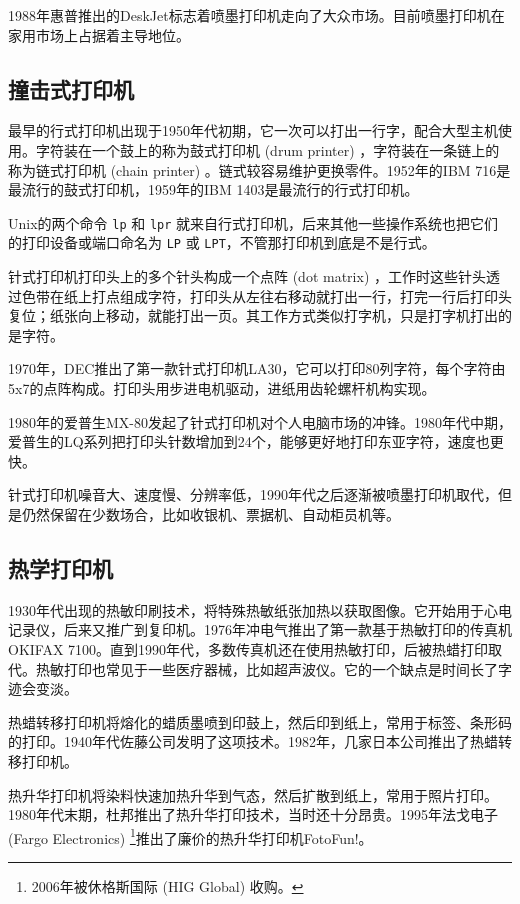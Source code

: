 1988年惠普推出的DeskJet标志着喷墨打印机走向了大众市场。目前喷墨打印机在家用市场上占据着主导地位。

\subsection{撞击式打印机}

最早的行式打印机出现于1950年代初期，它一次可以打出一行字，配合大型主机使用。字符装在一个鼓上的称为鼓式打印机 (drum printer) ，字符装在一条链上的称为链式打印机 (chain printer) 。链式较容易维护更换零件。1952年的IBM 716是最流行的鼓式打印机，1959年的IBM 1403是最流行的行式打印机。

Unix的两个命令 \texttt{lp} 和 \texttt{lpr} 就来自行式打印机，后来其他一些操作系统也把它们的打印设备或端口命名为 \texttt{LP} 或 \texttt{LPT}，不管那打印机到底是不是行式。

针式打印机打印头上的多个针头构成一个点阵 (dot matrix) ，工作时这些针头透过色带在纸上打点组成字符，打印头从左往右移动就打出一行，打完一行后打印头复位；纸张向上移动，就能打出一页。其工作方式类似打字机，只是打字机打出的是字符。

1970年，DEC\indexDEC{}推出了第一款针式打印机LA30，它可以打印80列字符，每个字符由5x7的点阵构成。打印头用步进电机驱动，进纸用齿轮螺杆机构实现。

1980年的爱普生MX-80发起了针式打印机对个人电脑市场的冲锋。1980年代中期，爱普生的LQ系列把打印头针数增加到24个，能够更好地打印东亚字符，速度也更快。

针式打印机噪音大、速度慢、分辨率低，1990年代之后逐渐被喷墨打印机取代，但是仍然保留在少数场合，比如收银机、票据机、自动柜员机等。

\subsection{热学打印机}

1930年代出现的热敏印刷技术，将特殊热敏纸张加热以获取图像。它开始用于心电记录仪，后来又推广到复印机。1976年冲电气推出了第一款基于热敏打印的传真机 OKIFAX 7100。直到1990年代，多数传真机还在使用热敏打印，后被热蜡打印取代。热敏打印也常见于一些医疗器械，比如超声波仪。它的一个缺点是时间长了字迹会变淡。

热蜡转移打印机将熔化的蜡质墨喷到印鼓上，然后印到纸上，常用于标签、条形码的打印。1940年代佐藤公司\indexSATO{}发明了这项技术。1982年，几家日本公司推出了热蜡转移打印机。

热升华打印机将染料快速加热升华到气态，然后扩散到纸上，常用于照片打印。1980年代末期，杜邦\indexDupont{}推出了热升华打印技术，当时还十分昂贵。1995年法戈电子 (Fargo Electronics)\indexFargo{} \footnote{2006年被休格斯国际 (HIG Global) 收购。}推出了廉价的热升华打印机FotoFun!。

